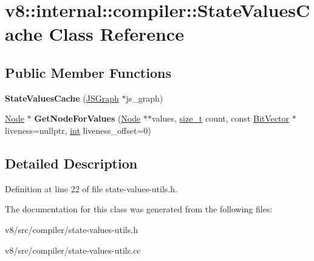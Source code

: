 \hypertarget{classv8_1_1internal_1_1compiler_1_1StateValuesCache}{}\section{v8\+:\+:internal\+:\+:compiler\+:\+:State\+Values\+Cache Class Reference}
\label{classv8_1_1internal_1_1compiler_1_1StateValuesCache}
\subsection*{Public Member Functions}
\begin{DoxyCompactItemize}
\item 
\mbox{\label{classv8_1_1internal_1_1compiler_1_1StateValuesCache_aeb424ea48a844ff289355359c435883e}} 
{\bfseries State\+Values\+Cache} (\mbox{\hyperlink{classv8_1_1internal_1_1compiler_1_1JSGraph}{J\+S\+Graph}} $\ast$js\+\_\+graph)
\item 
\mbox{\label{classv8_1_1internal_1_1compiler_1_1StateValuesCache_a092466a68d50a0f034a1d93560f3d5cd}} 
\mbox{\hyperlink{classv8_1_1internal_1_1compiler_1_1Node}{Node}} $\ast$ {\bfseries Get\+Node\+For\+Values} (\mbox{\hyperlink{classv8_1_1internal_1_1compiler_1_1Node}{Node}} $\ast$$\ast$values, \mbox{\hyperlink{classsize__t}{size\+\_\+t}} count, const \mbox{\hyperlink{classv8_1_1internal_1_1BitVector}{Bit\+Vector}} $\ast$liveness=nullptr, \mbox{\hyperlink{classint}{int}} liveness\+\_\+offset=0)
\end{DoxyCompactItemize}


\subsection{Detailed Description}


Definition at line 22 of file state-\/values-\/utils.\+h.



The documentation for this class was generated from the following files\+:\begin{DoxyCompactItemize}
\item 
v8/src/compiler/state-\/values-\/utils.\+h\item 
v8/src/compiler/state-\/values-\/utils.\+cc\end{DoxyCompactItemize}
